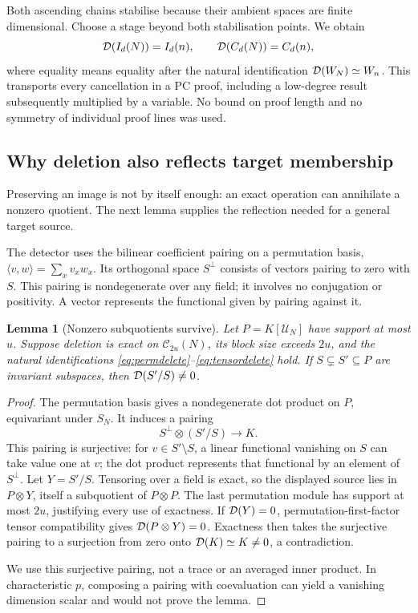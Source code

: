 \documentclass[11pt,a4paper]{article}
\newtheorem{lemma}[theorem]{Lemma}
\theoremstyle{definition}\newtheorem{definition}[theorem]{Definition}
\theoremstyle{remark}\newtheorem{remark}[theorem]{Remark}
\begin{document}
Both ascending chains stabilise because their ambient spaces are finite
dimensional. Choose a stage beyond both stabilisation points. We obtain
\begin{equation}\label{eq:consequence-transport}
 \mathcal D(I_d(N))=I_d(n),\qquad \mathcal D(C_d(N))=C_d(n),
\end{equation}
where equality means equality after the natural identification
$\mathcal D(W_N)\simeq W_n$. This transports every cancellation in a PC
proof, including a low-degree result subsequently multiplied by a
variable. No bound on proof length and no symmetry of individual proof
lines was used.

\subsection{Why deletion also reflects target membership}
Preserving an image is not by itself enough: an exact operation can
annihilate a nonzero quotient. The next lemma supplies the reflection
needed for a general target source.

The detector uses the bilinear coefficient pairing on a permutation
basis, $\langle v,w\rangle=\sum_x v_xw_x$. Its orthogonal space
$S^\perp$ consists of vectors pairing to zero with $S$. This pairing
is nondegenerate over any field; it involves no conjugation or
positivity. A vector represents the functional given by pairing
against it.

\begin{lemma}[Nonzero subquotients survive]\label{lem:detect}
Let $P=K[\mathcal U_N]$ have support at most $u$. Suppose deletion is
exact on $\mathcal C_{2u}(N)$, its block size exceeds $2u$, and the
natural identifications \eqref{eq:permdelete}--\eqref{eq:tensordelete}
hold. If $S\subsetneq S'\subseteq P$ are invariant subspaces, then
$\mathcal D(S'/S)\ne0$.
\end{lemma}
\begin{proof}
The permutation basis gives a nondegenerate dot product on $P$,
equivariant under $S_N$. It induces a pairing
\[
                         S^\perp\otimes(S'/S)\longrightarrow K.
\]
This pairing is surjective: for $v\in S'\setminus S$, a linear
functional vanishing on $S$ can take value one at $v$; the dot product
represents that functional by an element of $S^\perp$.
Let $Y=S'/S$. Tensoring over a field is exact, so the displayed
source lies in $P\otimes Y$, itself a subquotient of $P\otimes P$.
The last permutation module has support at most $2u$, justifying
every use of exactness. If $\mathcal D(Y)=0$, permutation-first-factor tensor
compatibility gives $\mathcal D(P\otimes Y)=0$. Exactness then takes the
surjective pairing to a surjection from zero onto
$\mathcal D(K)\simeq K\ne0$, a contradiction.

We use this surjective pairing, not a trace or an averaged inner
product. In characteristic $p$, composing a pairing with coevaluation
can yield a vanishing dimension scalar and would not prove the lemma.
\end{proof}
\end{document}
